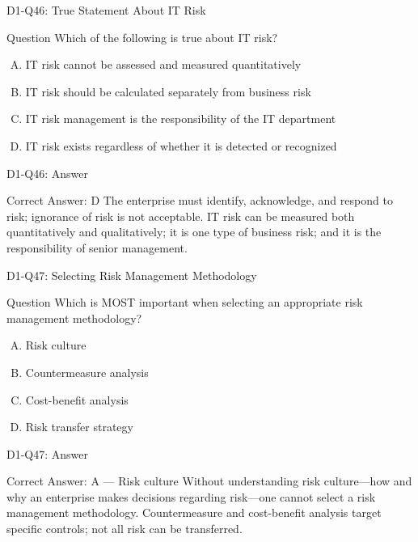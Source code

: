 \documentclass{beamer}
\begin{document}
	\begin{frame}{D1-Q46: True Statement About IT Risk}
		\begin{block}{Question}
			Which of the following is true about IT risk?
		\end{block}
		\begin{enumerate}[(A)]
			\item IT risk cannot be assessed and measured quantitatively
			\item IT risk should be calculated separately from business risk
			\item IT risk management is the responsibility of the IT department
			\item IT risk exists regardless of whether it is detected or recognized
		\end{enumerate}
	\end{frame}
	\begin{frame}{D1-Q46: Answer}
		\begin{block}{Correct Answer: D}
			The enterprise must identify, acknowledge, and respond to risk; ignorance of risk is not acceptable. IT risk can be measured both quantitatively and qualitatively; it is one type of business risk; and it is the responsibility of senior management.
		\end{block}
	\end{frame}
	
	\begin{frame}{D1-Q47: Selecting Risk Management Methodology}
		\begin{block}{Question}
			Which is MOST important when selecting an appropriate risk management methodology?
		\end{block}
		\begin{enumerate}[(A)]
			\item Risk culture
			\item Countermeasure analysis
			\item Cost-benefit analysis
			\item Risk transfer strategy
		\end{enumerate}
	\end{frame}
	\begin{frame}{D1-Q47: Answer}
		\begin{block}{Correct Answer: A --- Risk culture}
			Without understanding risk culture---how and why an enterprise makes decisions regarding risk---one cannot select a risk management methodology. Countermeasure and cost-benefit analysis target specific controls; not all risk can be transferred.
		\end{block}
	\end{frame}
	
\end{document}

